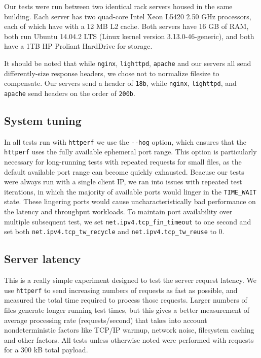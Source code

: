 \documentclass[twoside,10pt]{article}
\newenvironment{Figure}
  {\par\medskip\noindent\minipage{\linewidth}}
  {\endminipage\par\medskip}
\begin{document}
\begin{multicols}{2}
Our tests were run between two identical rack servers housed in the
same building. Each server has two quad-core Intel Xeon L5420 2.50 GHz
processors, each of which have with a 12 MB L2 cache. Both servers
have 16 GB of RAM, both run Ubuntu 14.04.2 LTS (Linux kernel version
3.13.0-46-generic), and both have a 1TB HP Proliant HardDrive for
storage.

It should be noted that while \verb+nginx+, \verb+lighttpd+,
\verb+apache+ and our servers all send differently-size response
headers, we chose not to normalize filesize to compensate. Our servers
send a header of \verb+18b+, while \verb+nginx+, \verb+lighttpd+, and
\verb+apache+ send headers on the order of \verb+200b+.

\subsection{System tuning}

In all tests run with \verb+httperf+ we use the \verb+--hog+ option,
which ensures that the \verb+httperf+ uses the fully available
ephemeral port range. This option is particularly necessary for
long-running tests with repeated requests for small files, as the
default available port range can become quickly exhausted. Beacuse our
tests were always run with a single client IP, we ran into issues with
repeated test iterations, in which the majority of available ports
would linger in the \verb+TIME_WAIT+ state. These lingering ports
would cause uncharacteristically bad performance on the latency and
throughput workloads. To maintain port availability over multiple
subsequent test, we set \verb+net.ipv4.tcp_fin_timeout+ to one second
and set both \verb+net.ipv4.tcp_tw_recycle+ and
\verb+net.ipv4.tcp_tw_reuse+ to 0.

\subsection{Server latency}

\begin{Figure}
This is a really simple experiment designed to test the server request
latency. We use \verb+httperf+ to send increasing numbers of requests
as fast as possible, and measured the total time required to process
those requests. Larger numbers of files generate longer running test
times, but this gives a better measurement of average processing rate
(requests/second) that takes into account nondeterministic factors
like TCP/IP warmup, network noise, filesystem caching and other factors. All tests unless otherwise noted were performed with requests for a 300 kB total 
payload.  


\end{Figure}
\end{multicols}
\end{document}

